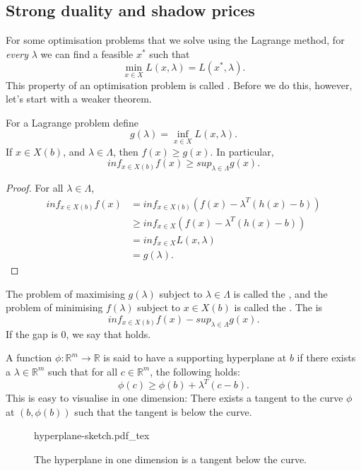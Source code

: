 \documentclass[a4paper]{scrartcl}
\newcommand{\incfig}[2]{%
    \def\svgwidth{#1mm}
    {#2.pdf_tex}
}
\begin{document}
\subsection{Strong duality and shadow prices}
For some optimisation problems that we solve using the Lagrange method, for \emph{every} $\lambda$ we can find a feasible $x^*$ such that 
\[\min_{x \in X} L (x, \lambda)=L(x^*,\lambda).\]
This property of an optimisation problem is called .
Before we do this, however, let's start with a weaker theorem.
\begin{theorem}
	 For a Lagrange problem define 
	 \[g (\lambda)=\inf_{x \in X}L (x,\lambda).\]
	 If $x \in X (b)$, and $\lambda \in \Lambda$, then $f (x)\geq g (x)$. In particular,
	 \[inf_{x \in X(b)}f(x) \geq sup_{\lambda \in \Lambda}g (x).\]
\end{theorem}
\begin{proof}
	For all $\lambda \in \Lambda$,
	 \begin{equation*}
		  \begin{split}
			inf_{x \in X(b)}f(x)&=inf_{x \in X(b)}(f(x)- \lambda^T (h(x)-b))\\
			&\geq inf_{x \in X}(f(x)- \lambda^T (h(x)-b))\\
			&=inf_{x \in X}L (x,\lambda)\\
			&=g (\lambda).
		  \end{split}
	 \end{equation*}
	 
\end{proof}

The problem of maximising $g (\lambda)$ subject to $\lambda \in \Lambda$ is called the , and the problem of minimising $f (\lambda)$ subject to $x \in X(b)$ is called the .\newline 
The  is 
\[inf_{x \in X(b)}f(x)- sup_{\lambda \in \Lambda}g (x).\]
If the gap is 0, we say that  holds.
\begin{definition}[Hyperplane]
	 A function $\phi: \mathbb{R}^{m} \to \mathbb{R} $ is said to have a supporting hyperplane at $b$ if there exists a $\lambda \in \mathbb{R}^{m}$ such that for all $c \in \mathbb{R}^{m} $, the following holds: 
	 \[\phi(c)\geq \phi (b)+ \lambda^T (c-b).\]
	 This is easy to visualise in one dimension: There exists a tangent to the curve $\phi$ at $(b,\phi(b))$ such that the tangent is below the curve.
	 \begin{figure}[H]
		\centering
		\incfig{70}{hyperplane-sketch}
		\caption{The hyperplane in one dimension is a tangent below the curve.}
	\end{figure}
\end{definition}
\end{document}
